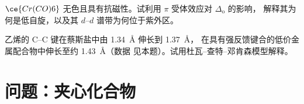 \begin{exercise}[$\star\star\star$]\label{exo:b3:organometallic-bonding:11}
$\ce{Cr(CO)6}$ 无色且具有抗磁性。试利用 $\pi$ 受体效应对 $\Delta_{\mathrm o}$ 的影响，
解释其为何是低自旋，以及其 $d$--$d$ 谱带为何位于紫外区。
\end{exercise}

\begin{exercise}[$\star\star\star$]\label{exo:b3:organometallic-bonding:12}
乙烯的 C--C 键在蔡斯盐中由 \qty{1.34}{\angstrom} 伸长到 \qty{1.37}{\angstrom}，
在具有强反馈键合的低价金属配合物中伸长至约 \qty{1.43}{\angstrom}（数据
见本题）。试用杜瓦–查特–邓肯森模型解释。
\end{exercise}

\section{问题：夹心化合物}

